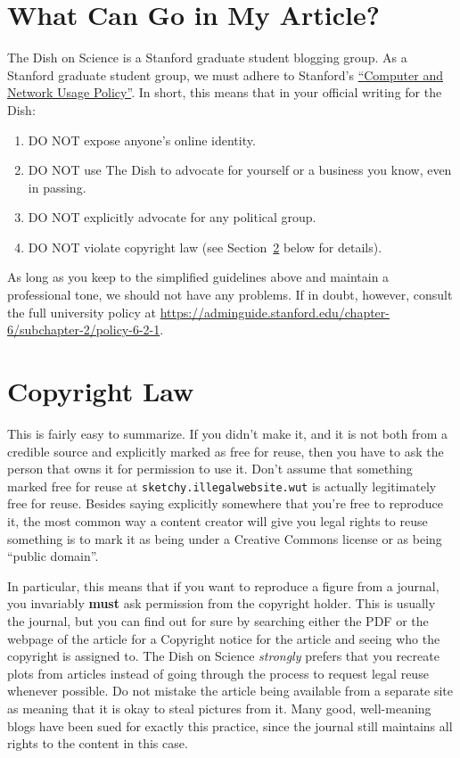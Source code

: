 \documentclass[paper=a4, fontsize=11pt]{scrartcl}
\numberwithin{equation}{section}        %
\numberwithin{figure}{section}            %
\numberwithin{table}{section}                %
\begin{document}
\section{What Can Go in My Article?}
The Dish on Science is a Stanford graduate student blogging group.
As a Stanford graduate student group, we must adhere to Stanford's
\href{https://adminguide.stanford.edu/chapter-6/subchapter-2/policy-6-2-1}{``Computer
and Network Usage Policy''}. In short, this means that in your official writing
for the Dish:\@
\begin{enumerate}
    \item DO NOT expose anyone's online identity.
    \item DO NOT use The Dish to advocate for yourself or a business you know,
        even in passing.
    \item DO NOT explicitly advocate for any political group.
    \item DO NOT violate copyright law (see
        Section~\ref{sec:copyright} below for details).
\end{enumerate}

As long as you keep to the simplified guidelines above and maintain a
professional tone, we should not have any problems. If in doubt, however,
consult the full university policy at
\url{https://adminguide.stanford.edu/chapter-6/subchapter-2/policy-6-2-1}.

\section{Copyright Law}\label{sec:copyright}

This is fairly easy to summarize. If you didn't make it, and it is not both from
a credible source and explicitly marked as free for reuse, then you have to ask
the person that owns it for permission to use it. Don't assume that something
marked free for reuse at \texttt{sketchy.illegalwebsite.wut} is actually
legitimately free for reuse.  Besides saying explicitly somewhere that you're
free to reproduce it, the most common way a content creator will give you legal
rights to reuse something is to mark it as being under a Creative Commons
license or as being ``public domain''.

In particular, this means that if you want to reproduce a figure from a journal,
you invariably \textbf{must} ask permission from the copyright holder. This is
usually the journal, but you can find out for sure by searching either the PDF
or the webpage of the article for a Copyright notice for the article and seeing
who the copyright is assigned to. The Dish on Science \textit{strongly} prefers
that you recreate plots from articles instead of going through the process to
request legal reuse whenever possible. Do not mistake the article being
available from a separate site as meaning that it is okay to steal pictures from
it. Many good, well-meaning blogs have been sued for exactly this practice,
since the journal still maintains all rights to the content in this case.
\end{document}
